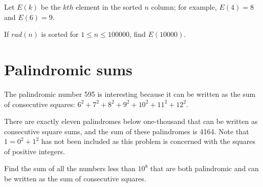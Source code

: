 Let $E(k)$ be the $kth$ element in the sorted $n$ column; for example, $E(4) = 8$ and $E(6) = 9$.

If $rad(n)$ is sorted for $1 \leqslant n \leqslant 100000$, find $E(10000)$.


\section{Palindromic sums} \label{pb.0125}

The palindromic number 595 is interesting because it can be written as the sum of consecutive squares: $6^2 + 7^2 + 8^2 + 9^2 + 10^2 + 11^2 + 12^2$.

There are exactly eleven palindromes below one-thousand that can be written as consecutive square sums, and the sum of these palindromes is 4164. Note that $1 = 0^2 + 1^2$ has not been included as this problem is concerned with the squares of positive integers.
\medskip

Find the sum of all the numbers less than $10^8$ that are both palindromic and can be written as the sum of consecutive squares.
